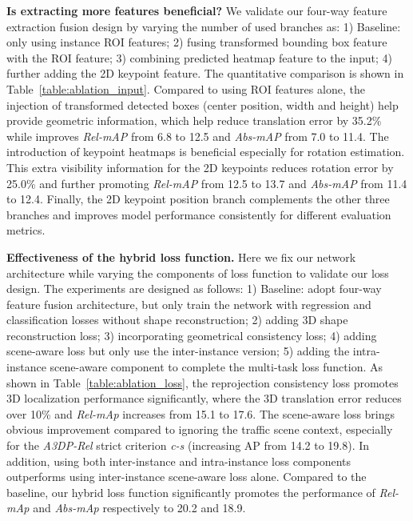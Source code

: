 \documentclass[runningheads]{llncs}
\begin{document}
\smallskip\noindent\textbf{Is extracting more features beneficial?}
We validate our four-way feature extraction fusion design by varying the number of used branches as:
1) Baseline: only using instance ROI features;
2) fusing transformed bounding box feature with the ROI feature;
3) combining predicted heatmap feature to the input;
4) further adding the 2D keypoint feature.
The quantitative comparison is shown in Table~\ref{table:ablation_input}. Compared to using ROI features alone, the injection of transformed detected boxes (center position, width and height) help provide geometric information, which help reduce translation error by 35.2\% while improves \textit{Rel-mAP} from 6.8 to 12.5 and \textit{Abs-mAP} from 7.0 to 11.4. 
The introduction of keypoint heatmaps is beneficial especially for rotation estimation. This extra visibility information for the 2D keypoints reduces rotation error by 25.0\% and further promoting \textit{Rel-mAP} from 12.5 to 13.7 and \textit{Abs-mAP} from 11.4 to 12.4. Finally, the 2D keypoint position branch complements the other three branches and improves model performance consistently for different evaluation metrics.

\smallskip\noindent\textbf{Effectiveness of the hybrid loss function.}
Here we fix our network architecture while varying the components of loss function to validate our loss design. 
The experiments are designed as follows:
1) Baseline: adopt four-way feature fusion architecture, but only train the network with regression and classification losses without shape reconstruction;
2) adding 3D shape reconstruction loss;
3) incorporating geometrical consistency loss;
4) adding scene-aware loss but only use the inter-instance version;
5) adding the intra-instance scene-aware component to complete the multi-task loss function.
As shown in Table~\ref{table:ablation_loss}, the reprojection consistency loss promotes 3D localization performance significantly, where the 3D translation error reduces over 10\% and \textit{Rel-mAp} increases from 15.1 to 17.6. The scene-aware loss brings obvious improvement compared to ignoring the traffic scene context, especially for the \textit{A3DP-Rel} strict criterion \textit{c-s} (increasing AP from 14.2 to 19.8). In addition, using both inter-instance and intra-instance loss components outperforms using inter-instance scene-aware loss alone. Compared to the baseline, our hybrid loss function significantly promotes the performance of \textit{Rel-mAp} and \textit{Abs-mAp} respectively to 20.2 and 18.9.
\end{document}
